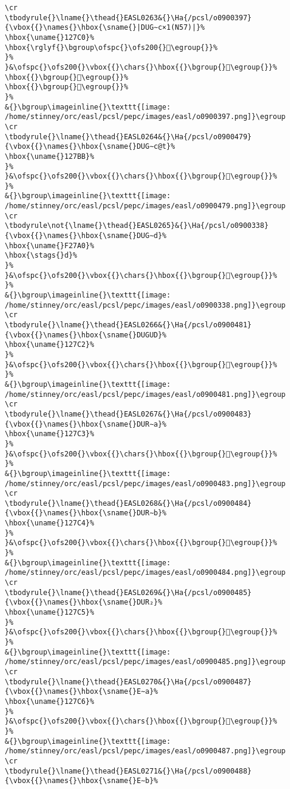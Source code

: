\begin{verbatim}
\cr
\tbodyrule{}\lname{}\thead{}EASL0263&{}\Ha{/pcsl/o0900397}{\vbox{{}\names{}\hbox{\sname{}|DUG∼c×1(N57)|}%
\hbox{\uname{}127C0}%
\hbox{\rglyf{}\bgroup\ofspc{}\ofs200{}𒟀\egroup{}}%
}%
}&\ofspc{}\ofs200{}\vbox{{}\chars{}\hbox{{}\bgroup{}𒞾\egroup{}}%
\hbox{{}\bgroup{}𒞽\egroup{}}%
\hbox{{}\bgroup{}𒟀\egroup{}}%
}%
&{}\bgroup\imageinline{}\texttt{[image: /home/stinney/orc/easl/pcsl/pepc/images/easl/o0900397.png]}\egroup
\cr
\tbodyrule{}\lname{}\thead{}EASL0264&{}\Ha{/pcsl/o0900479}{\vbox{{}\names{}\hbox{\sname{}DUG∼c@t}%
\hbox{\uname{}127BB}%
}%
}&\ofspc{}\ofs200{}\vbox{{}\chars{}\hbox{{}\bgroup{}𒞻\egroup{}}%
}%
&{}\bgroup\imageinline{}\texttt{[image: /home/stinney/orc/easl/pcsl/pepc/images/easl/o0900479.png]}\egroup
\cr
\tbodyrule\not{\lname{}\thead{}EASL0265}&{}\Ha{/pcsl/o0900338}{\vbox{{}\names{}\hbox{\sname{}DUG∼d}%
\hbox{\uname{}F27A0}%
\hbox{\stags{}d}%
}%
}&\ofspc{}\ofs200{}\vbox{{}\chars{}\hbox{{}\bgroup{}󲞠\egroup{}}%
}%
&{}\bgroup\imageinline{}\texttt{[image: /home/stinney/orc/easl/pcsl/pepc/images/easl/o0900338.png]}\egroup
\cr
\tbodyrule{}\lname{}\thead{}EASL0266&{}\Ha{/pcsl/o0900481}{\vbox{{}\names{}\hbox{\sname{}DUGUD}%
\hbox{\uname{}127C2}%
}%
}&\ofspc{}\ofs200{}\vbox{{}\chars{}\hbox{{}\bgroup{}𒟂\egroup{}}%
}%
&{}\bgroup\imageinline{}\texttt{[image: /home/stinney/orc/easl/pcsl/pepc/images/easl/o0900481.png]}\egroup
\cr
\tbodyrule{}\lname{}\thead{}EASL0267&{}\Ha{/pcsl/o0900483}{\vbox{{}\names{}\hbox{\sname{}DUR∼a}%
\hbox{\uname{}127C3}%
}%
}&\ofspc{}\ofs200{}\vbox{{}\chars{}\hbox{{}\bgroup{}𒟃\egroup{}}%
}%
&{}\bgroup\imageinline{}\texttt{[image: /home/stinney/orc/easl/pcsl/pepc/images/easl/o0900483.png]}\egroup
\cr
\tbodyrule{}\lname{}\thead{}EASL0268&{}\Ha{/pcsl/o0900484}{\vbox{{}\names{}\hbox{\sname{}DUR∼b}%
\hbox{\uname{}127C4}%
}%
}&\ofspc{}\ofs200{}\vbox{{}\chars{}\hbox{{}\bgroup{}𒟄\egroup{}}%
}%
&{}\bgroup\imageinline{}\texttt{[image: /home/stinney/orc/easl/pcsl/pepc/images/easl/o0900484.png]}\egroup
\cr
\tbodyrule{}\lname{}\thead{}EASL0269&{}\Ha{/pcsl/o0900485}{\vbox{{}\names{}\hbox{\sname{}DUR₂}%
\hbox{\uname{}127C5}%
}%
}&\ofspc{}\ofs200{}\vbox{{}\chars{}\hbox{{}\bgroup{}𒟅\egroup{}}%
}%
&{}\bgroup\imageinline{}\texttt{[image: /home/stinney/orc/easl/pcsl/pepc/images/easl/o0900485.png]}\egroup
\cr
\tbodyrule{}\lname{}\thead{}EASL0270&{}\Ha{/pcsl/o0900487}{\vbox{{}\names{}\hbox{\sname{}E∼a}%
\hbox{\uname{}127C6}%
}%
}&\ofspc{}\ofs200{}\vbox{{}\chars{}\hbox{{}\bgroup{}𒟆\egroup{}}%
}%
&{}\bgroup\imageinline{}\texttt{[image: /home/stinney/orc/easl/pcsl/pepc/images/easl/o0900487.png]}\egroup
\cr
\tbodyrule{}\lname{}\thead{}EASL0271&{}\Ha{/pcsl/o0900488}{\vbox{{}\names{}\hbox{\sname{}E∼b}%

\end{verbatim}
